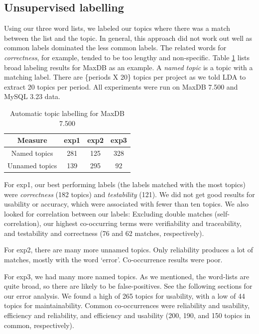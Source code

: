 \documentclass[]{sig-alternate}
\begin{document}
\subsection{Unsupervised labelling}
Using our three word lists, we labeled our topics where there was a match between the list and the topic. In general, this approach did not work out well as common labels dominated the less common labels. The related words for \emph{correctness}, for example, tended to be too lengthy and non-specific. 
Table \ref{tbl:wordlist} lists broad labeling results for MaxDB as an example. A \emph{named topic} is a topic with a matching label. There are \{periods X 20\} topics per project as we told LDA to extract 20 topics per period. All experiments were run on MaxDB 7.500 and MySQL 3.23 data.

\begin{table}
	\centering
\begin{tabular}{c|c|c|c}
\toprule
Measure & \textsf{exp1} & \textsf{exp2} & \textsf{exp3} \\
\midrule
Named topics   & 281 & 125 & 328  \\
Unnamed topics & 139 & 295 & 92   \\
\bottomrule
\end{tabular}
	\caption{Automatic topic labelling for MaxDB 7.500}
	\label{tbl:wordlist}

\end{table}

For \textsf{exp1}, our best performing labels (the labels matched with the most topics) were \emph{correctness} (182 topics) and \emph{testability} (121). We did not get good results for usability or accuracy, which were associated with fewer than ten topics. We also looked for correlation between our labels: Excluding double matches (self-correlation), our highest co-occurring terms were verifiability and traceability, and testability and correctness (76 and 62 matches, respectively).

For \textsf{exp2}, there are many more unnamed topics. Only reliability produces a lot of matches, mostly with the word `error'. Co-occurrence results were poor.

For \textsf{exp3}, we had many more named topics. As we mentioned, the word-lists are quite broad, so there are likely to be false-positives. See the following sections for our error analysis. We found a high of 265 topics for usability, with a low of 44 topics for maintainability. Common co-occurrences were reliability and usability, efficiency and reliability, and efficiency and usability (200, 190, and 150 topics in common, respectively). 
\end{document}
